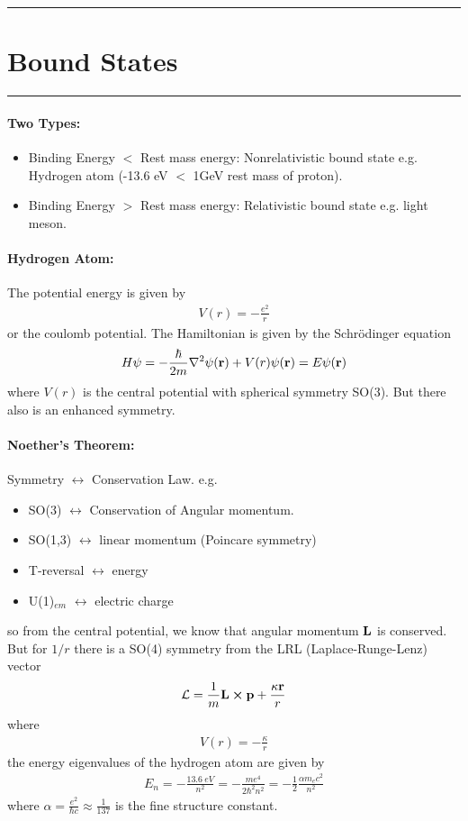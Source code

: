 \documentclass[../main.tex]{subfiles}
\begin{document}
\hrule
\section{Bound States}
\hrule \vspace{10px}


\paragraph*{Two Types:}
\begin{itemize}
    \item Binding Energy $<$ Rest mass energy: Nonrelativistic bound state e.g. Hydrogen atom
    (-13.6 eV $<$ 1GeV rest mass of proton). 
    \item Binding Energy $>$ Rest mass energy: Relativistic bound state e.g. light meson.
\end{itemize}
\paragraph*{Hydrogen Atom:} The potential energy is given by
\begin{align*}
    V(r) = -\frac{e^2}{r}
\end{align*}
or the coulomb potential. The Hamiltonian is given by the Schr\"odinger equation
\begin{align*}
    H\psi = -\frac{\hbar}{2m} \laplacian \psi(\vb r) + V(r) \psi(\vb r) = E\psi(\vb r)
\end{align*}
where $V(r)$ is the central potential with spherical symmetry SO(3). But there also is an enhanced 
symmetry.
\paragraph*{Noether's Theorem:} Symmetry $\leftrightarrow$ Conservation Law. e.g. 
\begin{itemize}
    \item SO(3) $\leftrightarrow$ Conservation of Angular momentum. 
    \item SO(1,3) $\leftrightarrow$ linear momentum (Poincare symmetry)
    \item T-reversal $\leftrightarrow$ energy
    \item U(1)$_{em}$ $\leftrightarrow$ electric charge
\end{itemize}
so from the central potential, we know that angular momentum $\vb L$ is conserved. But for
$1/r$ there is a SO(4) symmetry from the LRL (Laplace-Runge-Lenz) vector
\begin{align*}
    \mathcal{L} = \frac{1}{m} \vb L \cross \vb p + \frac{\kappa \vb r}{r}
\end{align*}
where
\begin{align*}
    V(r) = -\frac{\kappa}{r}
\end{align*}
the energy eigenvalues of the hydrogen atom are given by
\begin{align*}
    E_n = -\frac{\qty{13.6}{eV}}{n^2} = -\frac{m e^4}{2\hbar^2 n^2}
     = -\frac{1}{2} \frac{\alpha m_e c^2}{n^2}
\end{align*}
where $\alpha = \frac{e^2}{\hbar c} \approx \frac{1}{137}$ is the fine structure constant.
\end{document}
